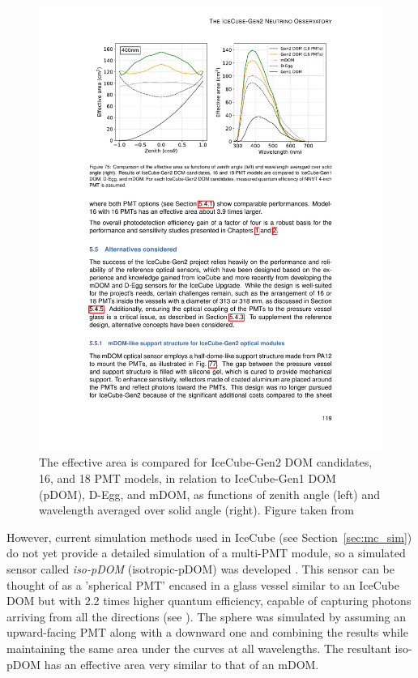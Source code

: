 \begin{figure}
    \includegraphics{./figures/gen2/EffectiveAreaCurve_TDR.pdf}
    \caption[DOM effective area comparisons of Multi-PMT modules with a current single PMT DOM of IceCube]{The effective area is compared for IceCube-Gen2 DOM candidates, 16, and 18 PMT models, in relation to IceCube-Gen1 DOM (pDOM), D-Egg, and mDOM, as functions of zenith angle (left) and wavelength averaged over solid angle (right). Figure taken from \cite{Gen2_TDR}} 
\end{figure}

However, current simulation methods used in IceCube (see Section~\ref{sec:mc_sim}) do not yet provide a detailed simulation of a multi-PMT module, so a simulated sensor called \emph{iso-pDOM} (isotropic-pDOM) was developed . This sensor can be thought of as a 'spherical PMT' encased in a glass vessel similar to an IceCube DOM but with 2.2 times higher quantum efficiency, capable of capturing photons arriving from all the directions (see ). The sphere was simulated by assuming an upward-facing PMT along with a downward one and combining the results while maintaining the same area under the curves at all wavelengths. The resultant iso-pDOM has an effective area very similar to that of an mDOM.

